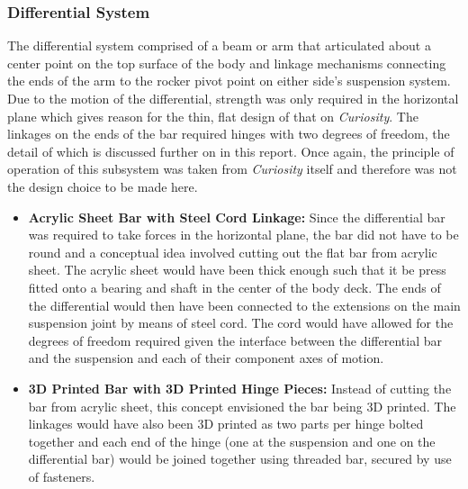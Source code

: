     \subsubsection{Differential System}
      The differential system comprised of a beam or arm that articulated about a center point on the top surface of the body and linkage mechanisms connecting the ends of the arm to the rocker pivot point on either side's suspension system. Due to the motion of the differential, strength was only required in the horizontal plane which gives reason for the thin, flat design of that on \textit{Curiosity}. The linkages on the ends of the bar required hinges with two degrees of freedom, the detail of which is discussed further on in this report. Once again, the principle of operation of this subsystem was taken from \textit{Curiosity} itself and therefore was not the design choice to be made here.
      
      \begin{itemize}
        \item \textbf{Acrylic Sheet Bar with Steel Cord Linkage:} Since the differential bar was required to take forces in the horizontal plane, the bar did not have to be round and a conceptual idea involved cutting out the flat bar from acrylic sheet. The acrylic sheet would have been thick enough such that it be press fitted onto a bearing and shaft in the center of the body deck. The ends of the differential would then have been connected to the extensions on the main suspension joint by means of steel cord. The cord would have allowed for the degrees of freedom required given the interface between the differential bar and the suspension and each of their component axes of motion.
        
        \item \textbf{3D Printed Bar with 3D Printed Hinge Pieces:} Instead of cutting the bar from acrylic sheet, this concept envisioned the bar being 3D printed. The linkages would have also been 3D printed as two parts per hinge bolted together and each end of the hinge (one at the suspension and one on the differential bar) would be joined together using threaded bar, secured by use of fasteners.
      \end{itemize}
      
